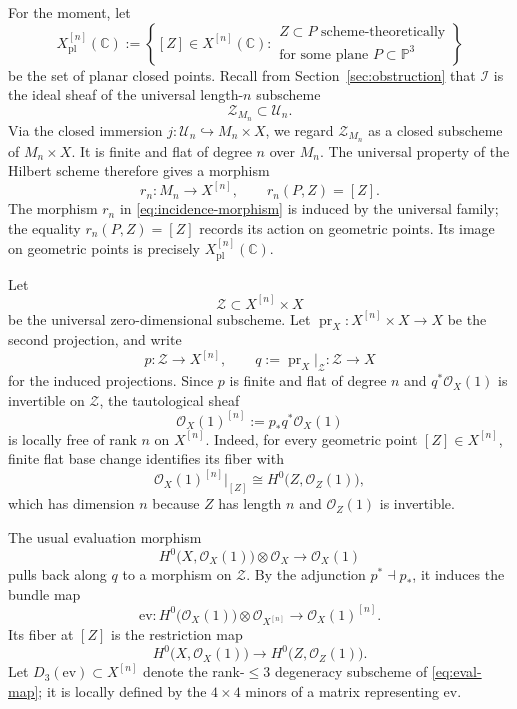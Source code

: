 \documentclass[12pt]{amsart}
\numberwithin{equation}{section}
\newcommand{\PP}{\mathbb{P}}
\newcommand{\C}{\mathbb{C}}
\newcommand{\OO}{\mathcal{O}}
\theoremstyle{plain}
\theoremstyle{definition}
\theoremstyle{remark}
\begin{document}
For the moment, let
\[
X^{[n]}_{\mathrm{pl}}(\C)
:=
\left\{
[Z]\in X^{[n]}(\C):
\begin{array}{l}
Z\subset P \text{ scheme-theoretically}\\
\text{for some plane }P\subset \PP^3
\end{array}
\right\}
\]
be the set of planar closed points.
Recall from Section~\ref{sec:obstruction} that $\mathcal I$ is the ideal sheaf of the universal length-$n$ subscheme
\[
\mathcal Z_{M_n}\subset \mathcal U_n.
\]
Via the closed immersion $j\colon \mathcal U_n\hookrightarrow M_n\times X$, we regard $\mathcal Z_{M_n}$ as a closed subscheme of $M_n\times X$.
It is finite and flat of degree $n$ over $M_n$.
The universal property of the Hilbert scheme therefore gives a morphism
\begin{equation}\label{eq:incidence-morphism}
r_n\colon M_n\longrightarrow X^{[n]},\qquad r_n(P,Z)=[Z].
\end{equation}
The morphism $r_n$ in \eqref{eq:incidence-morphism} is induced by the universal family; the equality $r_n(P,Z)=[Z]$ records its action on geometric points.
Its image on geometric points is precisely $X^{[n]}_{\mathrm{pl}}(\C)$.

Let
\[
\mathcal Z\subset X^{[n]}\times X
\]
be the universal zero-dimensional subscheme.
Let $\operatorname{pr}_X\colon X^{[n]}\times X\to X$ be the second projection, and write
\[
p\colon \mathcal Z\longrightarrow X^{[n]},
\qquad
q:=\operatorname{pr}_X|_{\mathcal Z}\colon \mathcal Z\longrightarrow X
\]
for the induced projections.
Since $p$ is finite and flat of degree $n$ and $q^*\OO_X(1)$ is invertible on $\mathcal Z$, the tautological sheaf
\[
\OO_X(1)^{[n]}:=p_*q^*\OO_X(1)
\]
is locally free of rank $n$ on $X^{[n]}$.
Indeed, for every geometric point $[Z]\in X^{[n]}$, finite flat base change identifies its fiber with
\[
\OO_X(1)^{[n]}|_{[Z]}
\cong H^0\bigl(Z,\OO_Z(1)\bigr),
\]
which has dimension $n$ because $Z$ has length $n$ and $\OO_Z(1)$ is invertible.

The usual evaluation morphism
\[
H^0\bigl(X,\OO_X(1)\bigr)\otimes\OO_X\longrightarrow\OO_X(1)
\]
pulls back along $q$ to a morphism on $\mathcal Z$.
By the adjunction $p^*\dashv p_*$, it induces the bundle map
\begin{equation}\label{eq:eval-map}
\mathrm{ev}\colon H^0\bigl(\OO_X(1)\bigr)\otimes \OO_{X^{[n]}}\longrightarrow \OO_X(1)^{[n]}.
\end{equation}
Its fiber at $[Z]$ is the restriction map
\[
H^0\bigl(X,\OO_X(1)\bigr)\longrightarrow H^0\bigl(Z,\OO_Z(1)\bigr).
\]
Let $D_3(\mathrm{ev})\subset X^{[n]}$ denote the rank-$\leq 3$ degeneracy subscheme of \eqref{eq:eval-map}; it is locally defined by the $4\times4$ minors of a matrix representing $\mathrm{ev}$.
\end{document}
